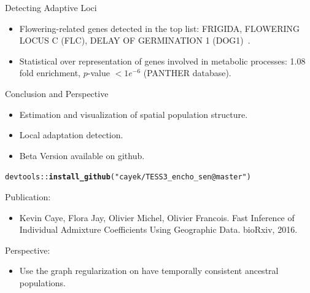 \documentclass{beamer}\usepackage[]{graphicx}\usepackage[]{color}
\makeatletter
\newcommand{\hlstr}[1]{\textcolor[rgb]{0.192,0.494,0.8}{#1}}%
\newcommand{\hlopt}[1]{\textcolor[rgb]{0,0,0}{#1}}%
\newcommand{\hlstd}[1]{\textcolor[rgb]{0.345,0.345,0.345}{#1}}%
\newcommand{\hlkwd}[1]{\textcolor[rgb]{0.737,0.353,0.396}{\textbf{#1}}}%
\newenvironment{kframe}{%
 \def\at@end@of@kframe{}%
 \ifinner\ifhmode%
  \def\at@end@of@kframe{\end{minipage}}%
  \begin{minipage}{\columnwidth}%
 \fi\fi%
 \def\FrameCommand##1{\hskip\@totalleftmargin \hskip-\fboxsep
 \colorbox{shadecolor}{##1}\hskip-\fboxsep
     \hskip-\linewidth \hskip-\@totalleftmargin \hskip\columnwidth}%
 \MakeFramed {\advance\hsize-\width
   \@totalleftmargin\z@ \linewidth\hsize
   \@setminipage}}%
 {\par\unskip\endMakeFramed%
 \at@end@of@kframe}
\newenvironment{knitrout}{}{} %
\makeatother
\begin{document}

\begin{frame}{Detecting Adaptive Loci}
\begin{itemize}
  \item Flowering-related genes detected in the top list: FRIGIDA, FLOWERING LOCUS C (FLC), 
  DELAY OF GERMINATION 1 (DOG1)~\citep{horton2012genome}.
  \item Statistical over representation of genes involved in metabolic processes: 
  1.08 fold enrichment, $p$-value $< 1e^{-6}$ (PANTHER database).
\end{itemize}
  
\end{frame}



\begin{frame}[fragile]{Conclusion and Perspective}

\begin{itemize}
  \item Estimation and visualization of spatial population structure.
  \item Local adaptation detection.
  \item Beta Version available on github.
\end{itemize}
  
\begin{knitrout}
\color{fgcolor}\begin{kframe}
\begin{alltt}
\hlstd{devtools}\hlopt{::}\hlkwd{install_github}\hlstd{(}\hlstr{"cayek/TESS3_encho_sen@master"}\hlstd{)}
\end{alltt}
\end{kframe}
\end{knitrout}

\alert{Publication:}

\begin{itemize}
  
\item Kevin Caye, Flora Jay, Olivier Michel, Olivier Francois. Fast Inference of
  Individual Admixture Coefficients Using Geographic Data. bioRxiv, 2016.
\end{itemize}

\alert{Perspective:}
\begin{itemize}
\item Use the graph regularization on have temporally consistent ancestral
  populations.
\end{itemize}


\end{frame}
\end{document}
